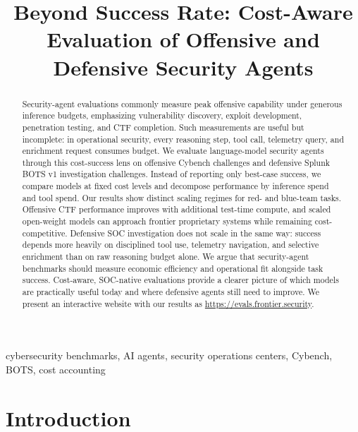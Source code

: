 \documentclass{jmlr}%
\title[Cost-Aware Security Agent Evaluation]{Beyond Success Rate: Cost-Aware Evaluation of Offensive and Defensive Security Agents}
\author{\Name{Paul Kassianik}
\AND
\Name{Blaine Nelson}
\AND
\Name{Yaron Singer}}
\begin{document}
\maketitle
\begingroup
\renewcommand{\thefootnote}{}
\renewcommand{\footnoteseptext}{}
\endgroup

\begin{abstract}
Security-agent evaluations commonly measure peak offensive capability under generous inference budgets, emphasizing vulnerability discovery, exploit development, penetration testing, and CTF completion.
Such measurements are useful but incomplete: in operational security, every reasoning step, tool call, telemetry query, and enrichment request consumes budget.
We evaluate language-model security agents through this cost-success lens on offensive Cybench challenges and defensive Splunk BOTS v1 investigation challenges.
Instead of reporting only best-case success, we compare models at fixed cost levels and decompose performance by inference spend and tool spend.
Our results show distinct scaling regimes for red- and blue-team tasks.
Offensive CTF performance improves with additional test-time compute, and scaled open-weight models can approach frontier proprietary systems while remaining cost-competitive.
Defensive SOC investigation does not scale in the same way: success depends more heavily on disciplined tool use, telemetry navigation, and selective enrichment than on raw reasoning budget alone.
We argue that security-agent benchmarks should measure economic efficiency and operational fit alongside task success.
Cost-aware, SOC-native evaluations provide a clearer picture of which models are practically useful today and where defensive agents still need to improve. We present an interactive website with our results as \href{https://evals.frontier.security}{https://evals.frontier.security}.
\end{abstract}

\begin{keywords}
cybersecurity benchmarks, AI agents, security operations centers, Cybench, BOTS, cost accounting
\end{keywords}

\section{Introduction}
\label{sec:introduction}
\end{document}

